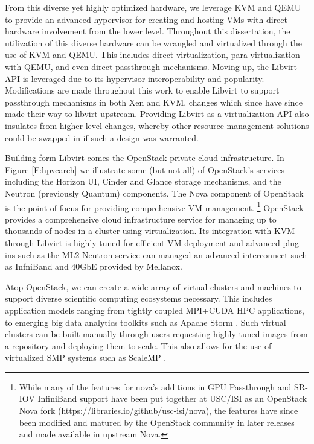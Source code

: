 From this diverse yet highly optimized hardware, we leverage KVM and QEMU to provide an advanced hypervisor for creating and hosting VMs with direct hardware involvement from the lower level.  Throughout this dissertation, the utilization of this diverse hardware can be wrangled and virtualized through the use of KVM and QEMU. This includes direct virtualization, para-virtualization with QEMU, and even direct passthrough mechanisms.  Moving up, the Libvirt API is leveraged due to its hypervisor interoperability and popularity. Modifications are made throughout this work to enable Libvirt to support passthrough mechanisms in both Xen and KVM, changes which since have since made their way to libvirt upstream.  Providing Libvirt as a virtualization API also insulates from higher level changes, whereby other resource management solutions could be swapped in if such a design was warranted. 

Building form Libvirt comes the OpenStack private cloud infrastructure. In Figure \ref{F:hpvcarch} we illustrate some (but not all) of OpenStack's services including the Horizon UI, Cinder and Glance storage mechanisms, and the Neutron (previously Quantum) components. The Nova component of OpenStack is the point of focus for providing comprehensive VM management.
\footnote{While many of the features for nova's additions in GPU Passthrough and SR-IOV InfiniBand support have been put together at USC/ISI as an OpenStack Nova fork (https://libraries.io/github/usc-isi/nova), the features have since been modified and matured by the OpenStack community in later releases and made available in upstream Nova.}  OpenStack provides a comprehensive cloud infrastructure service for managing up to thousands of nodes in a cluster using virtualization. Its integration with KVM through Libvirt is highly tuned for efficient  VM deployment and advanced plug-ins such as the ML2 Neutron service can managed an advanced interconnect such as InfniBand and 40GbE provided by Mellanox. 

Atop OpenStack, we can create a wide array of virtual clusters and machines to support diverse scientific computing ecosystems necessary. This includes application models ranging from tightly coupled MPI+CUDA HPC applications, to emerging big data analytics toolkits such as Apache Storm \cite{kamburugamuve2016streaming}. Such virtual clusters can be built manually through users requesting highly tuned images from a repository and deploying them to scale. This also allows for the use of virtualized SMP systems such as ScaleMP \cite{Younge2016smp}.


